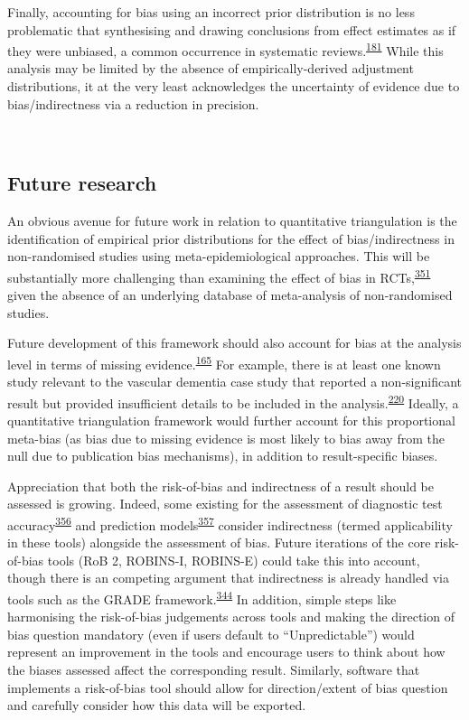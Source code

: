 \documentclass[a4paper, twoside]{templates/ociamthesis}
\begin{document}
Finally, accounting for bias using an incorrect prior distribution is no less problematic that synthesising and drawing conclusions from effect estimates as if they were unbiased, a common occurrence in systematic reviews.\textsuperscript{\protect\hyperlink{ref-katikireddi2015}{181}} While this analysis may be limited by the absence of empirically-derived adjustment distributions, it at the very least acknowledges the uncertainty of evidence due to bias/indirectness via a reduction in precision.

~

\newpage

\hypertarget{future-research}{%
\subsection{Future research}\label{future-research}}

An obvious avenue for future work in relation to quantitative triangulation is the identification of empirical prior distributions for the effect of bias/indirectness in non-randomised studies using meta-epidemiological approaches. This will be substantially more challenging than examining the effect of bias in RCTs,\textsuperscript{\protect\hyperlink{ref-savovic2018}{351}} given the absence of an underlying database of meta-analysis of non-randomised studies.

Future development of this framework should also account for bias at the analysis level in terms of missing evidence.\textsuperscript{\protect\hyperlink{ref-zotero-15123}{165}} For example, there is at least one known study relevant to the vascular dementia case study that reported a non-significant result but provided insufficient details to be included in the analysis.\textsuperscript{\protect\hyperlink{ref-chiang2007}{220}} Ideally, a quantitative triangulation framework would further account for this proportional meta-bias (as bias due to missing evidence is most likely to bias away from the null due to publication bias mechanisms), in addition to result-specific biases.

Appreciation that both the risk-of-bias and indirectness of a result should be assessed is growing. Indeed, some existing for the assessment of diagnostic test accuracy\textsuperscript{\protect\hyperlink{ref-whiting2011}{356}} and prediction models\textsuperscript{\protect\hyperlink{ref-moons2019}{357}} consider indirectness (termed applicability in these tools) alongside the assessment of bias. Future iterations of the core risk-of-bias tools (RoB 2, ROBINS-I, ROBINS-E) could take this into account, though there is an competing argument that indirectness is already handled via tools such as the GRADE framework.\textsuperscript{\protect\hyperlink{ref-guyatt2011}{344}} In addition, simple steps like harmonising the risk-of-bias judgements across tools and making the direction of bias question mandatory (even if users default to ``Unpredictable'') would represent an improvement in the tools and encourage users to think about how the biases assessed affect the corresponding result. Similarly, software that implements a risk-of-bias tool should allow for direction/extent of bias question and carefully consider how this data will be exported.
\end{document}

